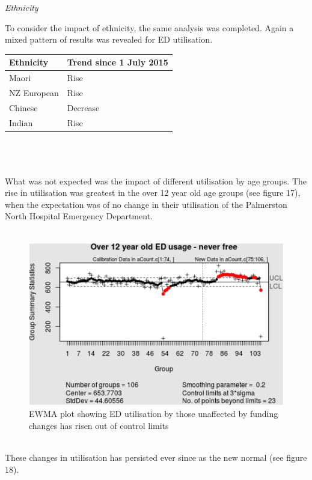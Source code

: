 \documentclass[11pt,a4paper]{article}
\begin{document}
\emph{Ethnicity}


To consider the impact of ethnicity, the same analysis was completed. Again a mixed pattern of results was revealed for ED utilisation.\\


\begin{tabular}{|l|l|}
\hline
        Ethnicity & Trend since 1 July 2015\\
\hline
        Maori & Rise\\
\hline
        NZ European & Rise\\
\hline
        Chinese & Decrease\\
\hline
        Indian & Rise\\
\hline
\end{tabular}
\\
\\
\\
What was not expected was the impact of different utilisation by age groups. The rise in utilisation was greatest in the over 12 year old age groups (see figure 17), when the expectation was of no change in their utilisation of the Palmerston North Hospital Emergency Department.\\
\\
\begin{figure}[htp]
\centering
\includegraphics[scale=0.50]{Over12.png}
\caption{EWMA plot showing ED utilisation by those unaffected by funding changes has risen out of control limits}
\label{Rise in ED utilisation by over 12 years old}
\end{figure}
\\

These changes in utilisation has persisted ever since as the new normal (see figure 18).\\
\\
\end{document}
